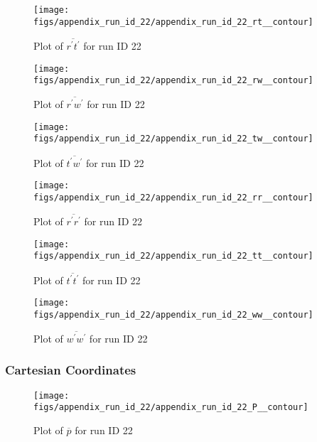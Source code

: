 \begin{figure}[H]
\centering
\texttt{[image: figs/appendix\_run\_id\_22/appendix\_run\_id\_22\_rt\_\_contour]}
\caption{Plot of $\overline{r^\prime t^\prime}$ for run ID 22}
\label{fig:appendix_run_id_22_rt__contour}
\end{figure}


\begin{figure}[H]
\centering
\texttt{[image: figs/appendix\_run\_id\_22/appendix\_run\_id\_22\_rw\_\_contour]}
\caption{Plot of $\overline{r^\prime w^\prime}$ for run ID 22}
\label{fig:appendix_run_id_22_rw__contour}
\end{figure}


\begin{figure}[H]
\centering
\texttt{[image: figs/appendix\_run\_id\_22/appendix\_run\_id\_22\_tw\_\_contour]}
\caption{Plot of $\overline{t^\prime w^\prime}$ for run ID 22}
\label{fig:appendix_run_id_22_tw__contour}
\end{figure}


\begin{figure}[H]
\centering
\texttt{[image: figs/appendix\_run\_id\_22/appendix\_run\_id\_22\_rr\_\_contour]}
\caption{Plot of $\overline{r^\prime r^\prime}$ for run ID 22}
\label{fig:appendix_run_id_22_rr__contour}
\end{figure}


\begin{figure}[H]
\centering
\texttt{[image: figs/appendix\_run\_id\_22/appendix\_run\_id\_22\_tt\_\_contour]}
\caption{Plot of $\overline{t^\prime t^\prime}$ for run ID 22}
\label{fig:appendix_run_id_22_tt__contour}
\end{figure}


\begin{figure}[H]
\centering
\texttt{[image: figs/appendix\_run\_id\_22/appendix\_run\_id\_22\_ww\_\_contour]}
\caption{Plot of $\overline{w^\prime w^\prime}$ for run ID 22}
\label{fig:appendix_run_id_22_ww__contour}
\end{figure}


\subsubsection{Cartesian Coordinates}
\begin{figure}[H]
\centering
\texttt{[image: figs/appendix\_run\_id\_22/appendix\_run\_id\_22\_P\_\_contour]}
\caption{Plot of $\overline{p}$ for run ID 22}
\label{fig:appendix_run_id_22_P__contour}
\end{figure}


